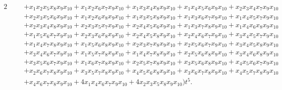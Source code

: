 \documentclass[12pt]{article}
\begin{document}
{\begin{alignat*}{2}
& && +x_{1}x_{2}x_{5}x_{8}x_{9}x_{10}+x_{1}x_{2}x_{6}x_{7}x_{9}x_{10}+x_{1}x_{3}x_{4}x_{8}x_{9}x_{10}+x_{1}x_{4}x_{5}x_{6}x_{9}x_{10}+x_{2}x_{3}x_{4}x_{7}x_{9}x_{10}\\
& && +x_{2}x_{3}x_{5}x_{6}x_{9}x_{10}+x_{1}x_{2}x_{6}x_{8}x_{9}x_{10}+x_{1}x_{3}x_{5}x_{8}x_{9}x_{10}+x_{1}x_{3}x_{6}x_{7}x_{9}x_{10}+x_{1}x_{4}x_{5}x_{7}x_{9}x_{10}\\
& && +x_{2}x_{3}x_{4}x_{8}x_{9}x_{10}+x_{2}x_{3}x_{5}x_{7}x_{9}x_{10}+x_{2}x_{4}x_{5}x_{6}x_{9}x_{10}+x_{1}x_{3}x_{7}x_{8}x_{9}x_{10}+x_{1}x_{4}x_{6}x_{8}x_{9}x_{10}\\
& && +x_{1}x_{5}x_{6}x_{7}x_{9}x_{10}+x_{2}x_{3}x_{6}x_{8}x_{9}x_{10}+x_{2}x_{4}x_{5}x_{8}x_{9}x_{10}+x_{2}x_{4}x_{6}x_{7}x_{9}x_{10}+x_{3}x_{4}x_{5}x_{7}x_{9}x_{10}\\
& && +x_{1}x_{4}x_{7}x_{8}x_{9}x_{10}+x_{1}x_{5}x_{6}x_{8}x_{9}x_{10}+x_{2}x_{3}x_{7}x_{8}x_{9}x_{10}+x_{2}x_{5}x_{6}x_{7}x_{9}x_{10}+x_{3}x_{4}x_{5}x_{8}x_{9}x_{10}\\
& && +x_{3}x_{4}x_{6}x_{7}x_{9}x_{10}+x_{1}x_{5}x_{7}x_{8}x_{9}x_{10}+x_{1}x_{4}x_{7}x_{8}x_{9}x_{10}+x_{2}x_{5}x_{6}x_{8}x_{9}x_{10}+x_{3}x_{4}x_{6}x_{8}x_{9}x_{10}\\
& && +x_{3}x_{5}x_{6}x_{7}x_{9}x_{10}+x_{1}x_{6}x_{7}x_{8}x_{9}x_{10}+x_{2}x_{5}x_{7}x_{8}x_{9}x_{10}+x_{3}x_{5}x_{6}x_{8}x_{9}x_{10}+x_{4}x_{5}x_{6}x_{7}x_{9}x_{10}\\
& && +x_{2}x_{6}x_{7}x_{8}x_{9}x_{10}+x_{3}x_{5}x_{7}x_{8}x_{9}x_{10}+x_{4}x_{5}x_{6}x_{8}x_{9}x_{10}+x_{3}x_{6}x_{7}x_{8}x_{9}x_{10}+x_{4}x_{5}x_{7}x_{8}x_{9}x_{10}\\
& && +x_{4}x_{6}x_{7}x_{8}x_{9}x_{10}+4x_{1}x_{4}x_{6}x_{7}x_{9}x_{10}+4x_{2}x_{3}x_{5}x_{8}x_{9}x_{10}) t^5. \\ 
\end{alignat*}}
\end{document}

